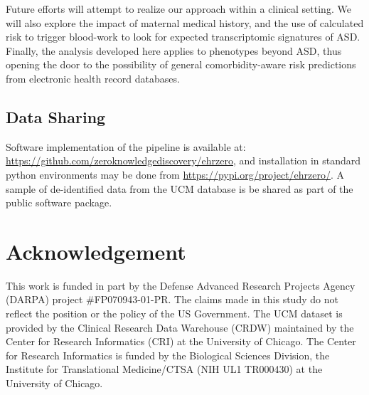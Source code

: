 \documentclass[onecolumn,10pt]{IEEEtran}
\begin{document}
Future efforts will attempt to realize our approach within a clinical setting. We will also explore the impact of  maternal medical history, and the  use of calculated risk to trigger   blood-work to look for expected  transcriptomic  signatures of ASD. Finally,  the analysis developed here applies to phenotypes beyond ASD, thus opening the door to the possibility of  general  comorbidity-aware risk predictions  from electronic health record databases.


\subsection*{Data Sharing} Software implementation of the pipeline is available at: \href{https://github.com/zeroknowledgediscovery/ehrzero}{https://github.com/zeroknowledgediscovery/ehrzero}, and installation in standard python environments
may be done from \href{https://pypi.org/project/ehrzero/}{https://pypi.org/project/ehrzero/}.
A sample of de-identified data
from the UCM database is be shared as part of the public software package.




\def\RIC{\RICTXT}

\def\MXCOL{black}
\def\FXCOL{Orchid3}
\def\MNCOL{SeaGreen4}
\def\FNCOL{SeaGreen4}
\def\NCOL{SeaGreen4}
\def\XCOL{Tomato}
\def\WCOL{Tomato}
\def\YCOL{DodgerBlue4}
\def\TEXTCOL{gray}
\def\AXISCOL{white}






\section*{Acknowledgement}
This work is funded in part by the Defense Advanced Research Projects Agency (DARPA) project \#FP070943-01-PR. The claims made in this study  do not  reflect the position or the policy of the US Government. The UCM dataset is provided by the Clinical Research Data Warehouse (CRDW) maintained by the Center for Research Informatics (CRI) at the  University of Chicago. The Center for Research Informatics is funded by the Biological Sciences Division, the Institute for Translational Medicine/CTSA (NIH UL1 TR000430) at the University of Chicago. 




%
% 
\end{document}
